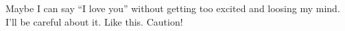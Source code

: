 

Maybe I can say ``I love you'' without getting too excited and loosing
my mind.  I'll be careful about it.  Like this.  Caution!

\bye
